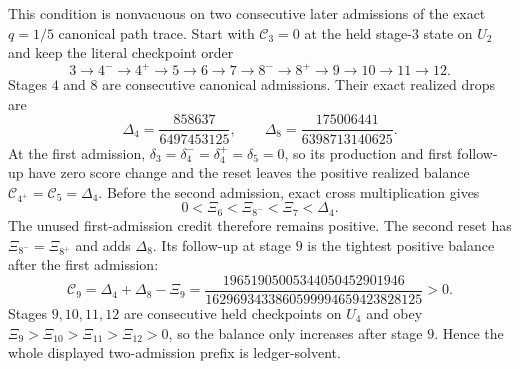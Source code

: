 \begin{proposition}
This condition is nonvacuous on two consecutive later admissions of the exact
$q=1/5$ canonical path trace.  Start with $\mathcal C_3=0$ at the held
stage-$3$ state on $U_2$ and keep the literal checkpoint order
\begin{equation*}
 3\longrightarrow4^-\longrightarrow4^+\longrightarrow5
 \longrightarrow6\longrightarrow7\longrightarrow8^-
 \longrightarrow8^+\longrightarrow9\longrightarrow10
 \longrightarrow11\longrightarrow12.
\end{equation*}
Stages $4$ and $8$ are consecutive canonical admissions.  Their exact
realized drops are
\begin{equation}
 \Delta_4=\frac{858637}{6497453125},
 \qquad
 \Delta_8=\frac{175006441}{6398713140625}.
 \label{eq:path-two-admission-drops}
\end{equation}
At the first admission,
$\delta_3=\delta_4^-=\delta_4^+=\delta_5=0$, so its production and first
follow-up have zero score change and the reset leaves the positive realized
balance $\mathcal C_{4^+}=\mathcal C_5=\Delta_4$.  Before the second
admission, exact cross multiplication gives
\begin{equation*}
 0<\Xi_6<\Xi_{8^-}<\Xi_7<\Delta_4.
\end{equation*}
The unused first-admission credit therefore remains positive.  The second
reset has $\Xi_{8^-}=\Xi_{8^+}$ and adds $\Delta_8$.  Its follow-up at stage
$9$ is the tightest positive balance after the first admission:
\begin{equation}
 \mathcal C_9
 =\Delta_4+\Delta_8-\Xi_9
 =\frac{19651905005344050452901946}
 {1629693433860599994659423828125}>0.
 \label{eq:path-two-admission-credit-minimum}
\end{equation}
Stages $9,10,11,12$ are consecutive held checkpoints on $U_4$ and obey
$\Xi_9>\Xi_{10}>\Xi_{11}>\Xi_{12}>0$, so the balance only increases after
stage $9$.  Hence the whole displayed two-admission prefix is ledger-solvent.


\end{proposition}
